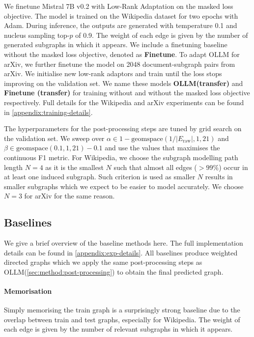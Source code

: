 \documentclass{article}
\newcommand{\name}{{OLLM}\xspace}
\begin{document}
We finetune Mistral 7B v0.2 \cite{jiang2023mistral} with Low-Rank Adaptation \cite{hu2021lora} on the masked loss objective. The model is trained on the Wikipedia dataset for two epochs with Adam. During inference, the outputs are generated with temperature 0.1 and nucleus sampling \cite{holtzman2019curious} top-$p$ of 0.9. The weight of each edge is given by the number of generated subgraphs in which it appears. We include a finetuning baseline without the masked loss objective, denoted as \textbf{Finetune}. To adapt \name for arXiv, we further finetune the model on 2048 document-subgraph pairs from arXiv. We initialise new low-rank adaptors and train until the loss stops improving on the validation set. We name these models \textbf{\name (transfer)} and \textbf{Finetune (transfer)} for training without and without the masked loss objective respectively. Full details for the Wikipedia and arXiv experiments can be found in \cref{appendix:training-details}.

The hyperparameters for the post-processing steps are tuned by grid search on the validation set. We sweep over $\alpha \in 1 - \text{geomspace}(1 / |E_\text{raw}|, 1, 21)$ and $\beta \in \text{geomspace}(0.1, 1, 21) - 0.1$ and use the values that maximises the continuous F1 metric. For Wikipedia, we choose the subgraph modelling path length $N=4$ as it is the smallest $N$ such that almost all edges ($>99\%$) occur in at least one induced subgraph. Such criterion is used as smaller $N$ results in smaller subgraphs which we expect to be easier to model accurately. We choose $N=3$ for arXiv for the same reason. 

\subsection{Baselines}

We give a brief overview of the baseline methods here. The full implementation details can be found in \cref{appendix:exp-details}. All baselines produce weighted directed graphs which we apply the same post-processing steps as \name (\cref{sec:method:post-processing}) to obtain the final predicted graph.

\paragraph{Memorisation}
Simply memorising the train graph is a surprisingly strong baseline due to the overlap between train and test graphs, especially for Wikipedia. The weight of each edge is given by the number of relevant subgraphs in which it appears.
\end{document}

